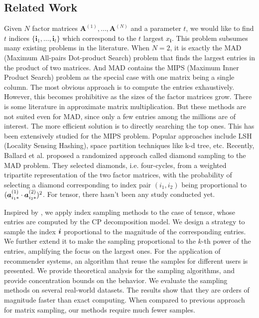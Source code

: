 \documentclass[letterpaper]{article}
\newcommand{\V}[1]{{\boldsymbol{{\MakeLowercase{#1}}}}}
\newcommand{\RowVecA}[1]{\V{a}^{(#1)}_{i_#1*}}
\begin{document}
\subsection{Related Work}
Given $N$ factor matrices $\textbf{A}^{(1)},\ldots,\textbf{A}^{(N)}$ and a parameter $t$, 
we would like to find $t$ indices $\{\boldsymbol{i}_1,\ldots,\boldsymbol{i}_t\}$ 
which correspond to the $t$ largest $x_{\boldsymbol{i}}$.
This problem subsumes many existing problems in the literature.
When $N=2$, it is exactly the MAD (Maximum All-pairs Dot-product Search)\cite{BaPiKoSe15} problem 
that finds the largest entries in the product of two matrices. 
And MAD contains the MIPS (Maximum Inner Product Search)\cite{Cohen97} problem 
as the special case with one matrix being a single column.
The most obvious approach is to compute the entries exhaustively. 
However, this becomes prohibitive as the sizes of the factor matrices grow. 
There is some literature in approximate matrix multiplication. 
But these methods are not suited even for MAD, 
since only a few entries among the millions are of interest. 
The more efficient solution is to directly searching the top ones. 
This has been extensively studied for the MIPS problem. 
Popular approaches include LSH (Locality Sensing Hashing), 
space partition techniques like k-d tree, etc. 
Recently, Ballard et al. proposed a randomized approach called diamond sampling to the MAD problem. 
They selected diamonds, i.e. four-cycles, from a weighted tripartite representation of the two factor matrices, 
with the probability of selecting a diamond corresponding to index pair $(i_1,i_2)$ being proportional to $(\RowVecA{1}\cdot\RowVecA{2})^2$.
For tensor, there hasn't been any study conducted yet.

Inspired by \cite{BaPiKoSe15}, 
we apply index sampling methods to the case of tensor, 
whose entries are computed by the CP decomposition model. 
We design a strategy to sample the index $\V{i}$ proportional to the magnitude of the corresponding entries. 
We further extend it to make the sampling proportional to the $k$-th power of the entries,
amplifying the focus on the largest ones. 
For the application of recommender systems, 
an algorithm that reuse the samples for different users is presented. 
We provide theoretical analysis for the sampling algorithms, 
and provide concentration bounds on the behavior. 
We evaluate the sampling methods on several real-world datasets. 
The results show that they are orders of magnitude faster than exact computing. 
When compared to previous approach for matrix sampling, our methods require much fewer samples.
\end{document}

